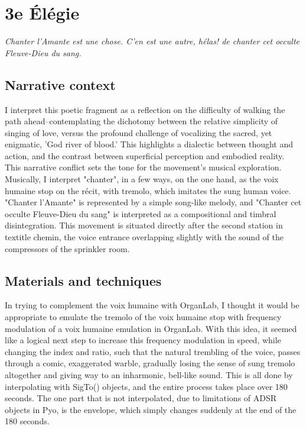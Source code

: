 \documentclass[12pt,twoside,maitrise]{dms_ks}
\theoremstyle{definition}
\begin{document}

\section{3e Élégie}

\epigraph{\textit{Chanter l'Amante est une chose. C'en est une autre, hélas! de chanter cet occulte Fleuve-Dieu du sang.}}{}

\subsection{Narrative context}

I interpret this poetic fragment as a reflection on the difficulty of walking the path ahead--contemplating the dichotomy between the relative simplicity of singing of love, versus the profound challenge of vocalizing the sacred, yet enigmatic, 'God river of blood.'  
This highlights a dialectic between thought and action, and the contrast between superficial perception and embodied reality.  
This narrative conflict sets the tone for the movement's musical exploration.  
Musically, I interpret "chanter", in a few ways, on the one hand, as the voix humaine stop on the récit, with tremolo, which imitates the sung human voice.  
"Chanter l'Amante" is represented by a simple song-like melody, and "Chanter cet occulte Fleuve-Dieu du sang" is interpreted as a compositional and timbral disintegration. 
This movement is situated directly after the second station in textit{le chemin}, the voice entrance overlapping slightly with the sound of the compressors of the sprinkler room.

\subsection{Materials and techniques}

In trying to complement the voix humaine with OrganLab, I thought it would be appropriate to emulate the tremolo of the voix humaine stop with frequency modulation of a voix humaine emulation in OrganLab.  
With this idea, it seemed like a logical next step to increase this frequency modulation in speed, while changing the index and ratio, such that the natural trembling of the voice, passes through a comic, exaggerated warble, gradually losing the sense of sung tremolo altogether and giving way to an inharmonic, bell-like sound.  
This is all done by interpolating with SigTo() objects, and the entire process takes place over 180 seconds.  
The one part that is not interpolated, due to limitations of ADSR objects in Pyo, is the envelope, which simply changes suddenly at the end of the 180 seconds.
\end{document}
